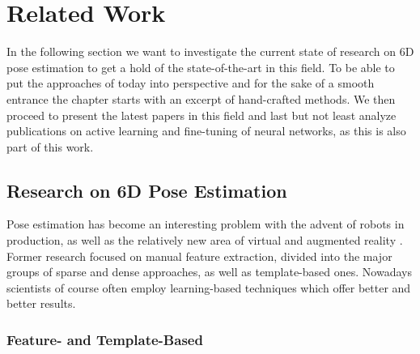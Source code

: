 \chapter{Related Work}

In the following section we want to investigate the current state of research on 6D pose estimation to get a hold of the state-of-the-art in this field. To be able to put the approaches of today into perspective and for the sake of a smooth entrance the chapter starts with an excerpt of hand-crafted methods. We then proceed to present the latest papers in this field and last but not least analyze publications on active learning and fine-tuning of neural networks, as this is also part of this work.

\section{Research on 6D Pose Estimation}

Pose estimation has become an interesting problem with the advent of robots in production, as well as the relatively new area of virtual and augmented reality \cite{bb8}. Former research focused on manual feature extraction, divided into the major groups of sparse and dense approaches, as well as template-based ones. Nowadays scientists of course often employ learning-based techniques which offer better and better results.

\subsection{Feature- and Template-Based}

